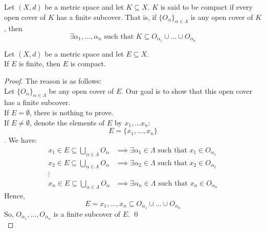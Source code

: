 %

%
	
	\begin{definition}[Compact]
		Let $(X,d)$ be a metric space and let $K \subseteq X$. $K$ is said to be compact if every open cover of $K$ has a finite subcover. That is, if $\{O_\alpha\}_{\alpha \in \Lambda}$ is any open cover of $K$, then
		$$\exists \alpha_1, ..., \alpha_n \text{ such that } K \subseteq O_{\alpha_1} \cup ... \cup O_{\alpha_n} $$
	\end{definition}
	
	\begin{example}
		Let $(X,d)$ be a metric space and let $E \subseteq X$. \\
		If $E$ is finite, then $E$ is compact.
	\end{example}
	\begin{proof}
	The reason is as follows:\\
	Let $\{O_\alpha\}_{\alpha \in \Lambda}$ be any open cover of $E$. Our goal is to show that this open cover has a finite subcover. \\
	If $E= \emptyset$, there is nothing to prove. \\
	If $E \not = \emptyset$, denote the elements of $E$ by $x_1,...x_n:$ $$E=\{x_1,...,x_n\}$$.
	We have:
	\begin{align*}
		x_1 \in E \subseteq \bigcup \limits_{\alpha \in \Lambda} O_\alpha &\implies \exists \alpha_1 \in \Lambda \text { such that } x_1 \in O_{\alpha_1} \\
		x_2 \in E \subseteq \bigcup \limits_{\alpha \in \Lambda} O_\alpha &\implies \exists \alpha_2\in \Lambda \text { such that } x_2 \in O_{\alpha_2} \\
		\vdots \\
		x_n \in E \subseteq \bigcup \limits_{\alpha \in \Lambda} O_\alpha &\implies \exists \alpha_n\in \Lambda \text { such that } x_n \in O_{\alpha_n} 
	\end{align*}
	Hence,
	$$E = {x_1, ..., x_n} \subseteq O_{\alpha_1} \cup ... \cup O_{\alpha_n}$$
	So, $O_{\alpha_1},...,O_{\alpha_n}$ is a finite subcover of $E$. \qed \\
	\end{proof}
	
